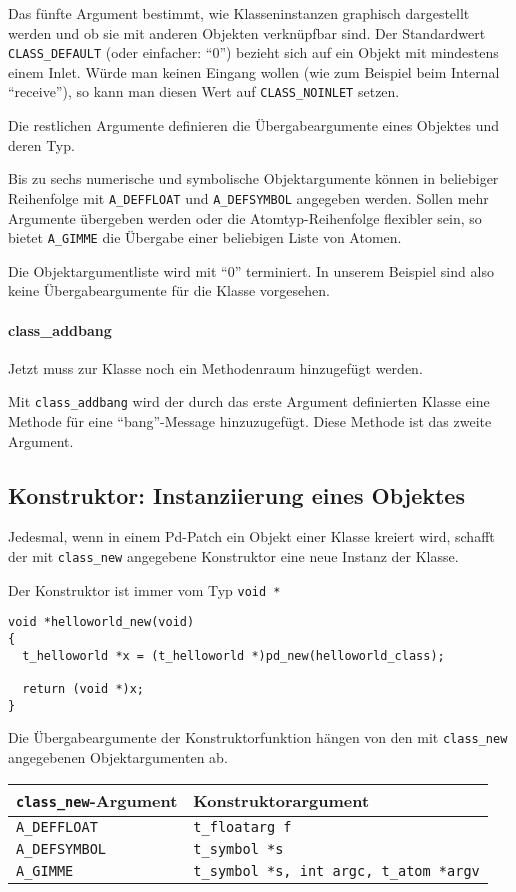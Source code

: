 \documentclass[12pt, a4paper,austrian, titlepage]{article}
\begin{document}
Das fünfte Argument bestimmt, wie Klasseninstanzen graphisch dargestellt werden und 
ob sie mit anderen Objekten verknüpfbar sind.
Der Standardwert \verb+CLASS_DEFAULT+ (oder einfacher: ``0'') bezieht sich auf
ein Objekt mit mindestens einem Inlet.
Würde man keinen Eingang wollen (wie zum Beispiel beim Internal ``receive''),
so kann man diesen Wert auf \verb+CLASS_NOINLET+ setzen.

Die restlichen Argumente definieren die Übergabeargumente eines Objektes und deren Typ.

Bis zu sechs numerische und symbolische Objektargumente können in beliebiger Reihenfolge
mit \verb+A_DEFFLOAT+ und \verb+A_DEFSYMBOL+ angegeben werden.
Sollen mehr Argumente übergeben werden oder die Atomtyp-Reihenfolge flexibler sein,
so bietet \verb+A_GIMME+ die Übergabe einer beliebigen Liste von Atomen.

Die Objektargumentliste wird mit ``0'' terminiert.
In unserem Beispiel sind also keine Übergabeargumente für die Klasse vorgesehen.

\paragraph{class\_addbang}
Jetzt muss zur Klasse noch ein Methodenraum hinzugefügt werden.

Mit \verb+class_addbang+ wird der durch das erste Argument definierten Klasse
eine Methode für eine ``bang''-Message hinzuzugefügt.
Diese Methode ist das zweite Argument.



\subsection{Konstruktor: Instanziierung eines Objektes}
Jedesmal, wenn in einem Pd-Patch ein Objekt einer Klasse kreiert wird,
schafft der mit \verb+class_new+ angegebene Konstruktor eine neue Instanz der Klasse.

Der Konstruktor ist immer vom Typ \verb+void *+

\begin{verbatim}
void *helloworld_new(void)
{
  t_helloworld *x = (t_helloworld *)pd_new(helloworld_class);

  return (void *)x;
}
\end{verbatim}

Die Übergabeargumente der Konstruktorfunktion hängen von den mit
\verb+class_new+ angegebenen Objektargumenten ab.

\begin{tabular}{l|l}
\verb+class_new+-Argument&Konstruktorargument\\
\hline
\verb+A_DEFFLOAT+&\verb+t_floatarg f+ \\
\verb+A_DEFSYMBOL+&\verb+t_symbol *s+ \\
\verb+A_GIMME+&\verb+t_symbol *s, int argc, t_atom *argv+
\end{tabular}
\end{document}
